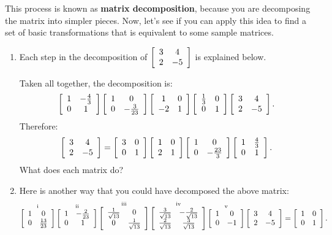 \documentclass[../gatm.tex]{subfiles}
\begin{document}
\noindent This process is known as \textbf{matrix decomposition}, because you are decomposing the matrix into simpler pieces. Now, let's see if you can apply this idea to find a set of basic transformations that is equivalent to some sample matrices.

\begin{enumerate}
\setcounter{enumi}{\value{problem_i}}
\item \label{prob:needed_for_matrix_undo1}Each step in the decomposition of $\left[\begin{array}{cc} 3 & 4 \\ 2 & -5 \end{array}\right]$ is explained below.
\begin{enumerate}[label=(\roman*)]
\end{enumerate}
Taken all together, the decomposition is:
$$\left[\begin{array}{cc} 1 & -\frac{4}{3} \\ 0 & 1 \end{array}\right]\left[\begin{array}{cc} 1 & 0 \\ 0 & -\frac{3}{23} \end{array}\right]\left[\begin{array}{cc} 1 & 0 \\ -2 & 1 \end{array}\right]\left[\begin{array}{cc} \frac{1}{3} & 0 \\ 0 & 1 \end{array}\right]\left[\begin{array}{cc} 3 & 4 \\ 2 & -5 \end{array}\right].$$
Therefore: $$\left[\begin{array}{cc} 3 & 4 \\ 2 & -5 \end{array}\right]=\left[\begin{array}{cc} 3 & 0 \\ 0 & 1 \end{array}\right]\left[\begin{array}{cc} 1 & 0 \\ 2 & 1 \end{array}\right]\left[\begin{array}{cc} 1 & 0 \\ 0 & -\frac{23}{3} \end{array}\right]\left[\begin{array}{cc} 1 & \frac{4}{3} \\ 0 & 1 \end{array}\right].$$
What does each matrix do?
\item\label{prob:needed_for_matrix_undo2}Here is another way that you could have decomposed the above matrix:
\vspace{-1em}
$$\mathop{\left[\begin{array}{cc} 1 & 0 \\ 0 & \frac{13}{23} \end{array}\right]}^{\text{i}}
\mathop{\left[\begin{array}{cc} 1 & -\frac{2}{23} \\ 0 & 1 \end{array}\right]}^{\text{ii}}
\mathop{\left[\begin{array}{cc} \frac{1}{\sqrt{13}} & 0 \\ 0 & \frac{1}{\sqrt{13}} \end{array}\right]}^{\text{iii}}
\mathop{\left[\begin{array}{cc} \frac{3}{\sqrt{13}} & -\frac{2}{\sqrt{13}} \\ \frac{2}{\sqrt{13}} & \frac{3}{\sqrt{13}} \end{array}\right]}^{\text{iv}}
\mathop{\left[\begin{array}{cc} 1 & 0 \\ 0 & -1 \end{array}\right]}^{\text{v}}
\left[\begin{array}{cc} 3 & 4 \\ 2 & -5 \end{array}\right]=\left[\begin{array}{cc} 1 & 0 \\ 0 & 1 \end{array}\right].$$
\begin{enumerate}

\end{enumerate}
\end{enumerate}
\end{document}
